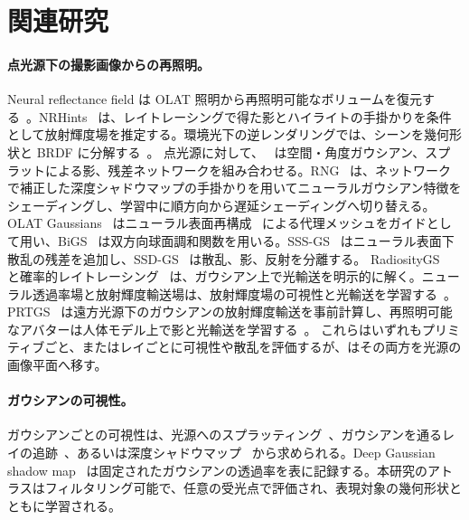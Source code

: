 \section{関連研究}
\label{sec:related}

\paragraph{点光源下の撮影画像からの再照明。}
Neural reflectance field は OLAT 照明から再照明可能なボリュームを復元する~\cite{bi2020neural,bi2020deep}。NRHints~\cite{zeng2023nrhints} は、レイトレーシングで得た影とハイライトの手掛かりを条件として放射輝度場を推定する。環境光下の逆レンダリングでは、シーンを幾何形状と BRDF に分解する~\cite{srinivasan2021nerv,zhang2021nerfactor,jin2023tensoir,gao2024relightable,liang2024gsir,jiang2024gaussianshader,chen2025gigs,gu2025irgs}。
点光源に対して、\gsthree~\cite{bi2024gs3} は空間・角度ガウシアン、スプラットによる影、残差ネットワークを組み合わせる。RNG~\cite{fan2025rng} は、ネットワークで補正した深度シャドウマップの手掛かりを用いてニューラルガウシアン特徴をシェーディングし、学習中に順方向から遅延シェーディングへ切り替える。OLAT Gaussians~\cite{kuang2024olat} はニューラル表面再構成~\cite{wang2021neus} による代理メッシュをガイドとして用い、BiGS~\cite{liu2025bigs} は双方向球面調和関数を用いる。SSS-GS~\cite{dihlmann2024sss} はニューラル表面下散乱の残差を追加し、SSD-GS~\cite{zheng2026ssdgs} は散乱、影、反射を分離する。
RadiosityGS~\cite{jiang2025radiosity} と確率的レイトレーシング~\cite{xu2026stochastic} は、ガウシアン上で光輸送を明示的に解く。ニューラル透過率場と放射輝度輸送場は、放射輝度場の可視性と光輸送を学習する~\cite{shafiei2021learning,lyu2022neural}。PRTGS~\cite{guo2024prtgs} は遠方光源下のガウシアンの放射輝度輸送を事前計算し、再照明可能なアバターは人体モデル上で影と光輸送を学習する~\cite{bolanos2024gaussian,saito2024rgca,wang2025fullbody}。
これらはいずれもプリミティブごと、またはレイごとに可視性や散乱を評価するが、\ours はその両方を光源の画像平面へ移す。

\paragraph{ガウシアンの可視性。}
ガウシアンごとの可視性は、光源へのスプラッティング~\cite{bi2024gs3,zheng2026ssdgs}、ガウシアンを通るレイの追跡~\cite{gao2024relightable,moenne2024gaussian,gu2025irgs,xu2026stochastic}、あるいは深度シャドウマップ~\cite{fan2025rng} から求められる。Deep Gaussian shadow map~\cite{mir2026animated} は固定されたガウシアンの透過率を表に記録する。本研究のアトラスはフィルタリング可能で、任意の受光点で評価され、表現対象の幾何形状とともに学習される。

